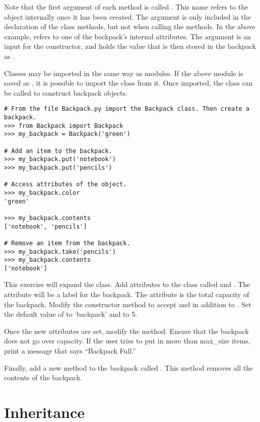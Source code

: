 Note that the first argument of each method is called .
This name refers to the object internally once it has been created.
The  argument is only included in the declaration of the class methods, but not when calling the methods.
In the above example,  refers to one of the backpack's internal attributes.
The argument  is an input for the constructor, and holds the value that is then stored in the backpack as .

Classes may be imported in the same way as modules.
If the above module is saved as , it is possible to import the  class from it.
Once imported, the  class can be called to construct backpack objects.

\begin{lstlisting}
# From the file Backpack.py import the Backpack class. Then create a backpack.
>>> from Backpack import Backpack
>>> my_backpack = Backpack('green')

# Add an item to the backpack.
>>> my_backpack.put('notebook')
>>> my_backpack.put('pencils')

# Access attributes of the object.
>>> my_backpack.color
'green'

>>> my_backpack.contents
['notebook', 'pencils']

# Remove an item from the backpack.
>>> my_backpack.take('pencils')
>>> my_backpack.contents
['notebook']
\end{lstlisting}

\begin{problem}
This exercise will expand the  class.
Add attributes to the class called  and .
The  attribute will be a label for the backpack.
The  attribute is the total capacity of the backpack.
Modify the constructor method to accept  and  in addition to .
Set the default value of  to `backpack' and  to 5.

Once the new attributes are set, modify the  method.
Ensure that the backpack does not go over capacity.
If the user tries to put in more than max\_size items, print a message that says ``Backpack Full.''

Finally, add a new method to the backpack called .
This method removes all the contents of the backpack.
\end{problem}

\section*{Inheritance}

